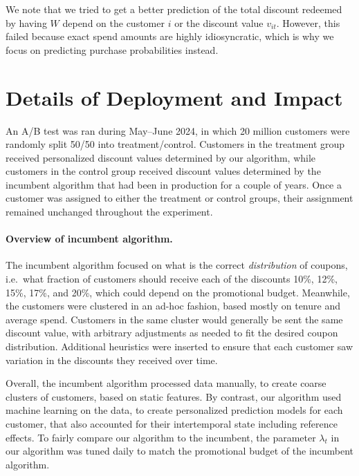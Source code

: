 \documentclass[format=acmsmall, review=false]{acmart}
\begin{document}
We note that we tried to get a better prediction of the total discount redeemed by having $W$ depend on the customer $i$ or the discount value $v_{it}$.  
However, this failed because exact spend amounts are highly idiosyncratic, which is why we focus on predicting purchase probabilities instead.

\section{Details of Deployment and Impact} \label{sec:deployResults}

An A/B test was ran during May--June 2024, in which 20 million customers were randomly split 50/50 into treatment/control.
Customers in the treatment group received personalized discount values determined by our algorithm, while
customers in the control group received discount values determined by the incumbent algorithm that had been in production for a couple of years.
Once a customer was assigned to either the treatment or control groups, their assignment remained unchanged throughout the experiment.

\paragraph{Overview of incumbent algorithm.}
The incumbent algorithm focused on what is the correct \textit{distribution} of coupons, i.e.\ what fraction of customers should receive each of the discounts 10\%, 12\%, 15\%, 17\%, and 20\%, which could depend on the promotional budget.
Meanwhile, the customers were clustered in an ad-hoc fashion, based mostly on tenure and average spend.
Customers in the same cluster would generally be sent the same discount value, with arbitrary adjustments as needed to fit the desired coupon distribution.
Additional heuristics were inserted to ensure that each customer saw variation in the discounts they received over time.

Overall, the incumbent algorithm processed data manually, to create coarse clusters of customers, based on static features.  By contrast, our algorithm used machine learning on the data, to create personalized prediction models for each customer, that also accounted for their intertemporal state including reference effects.  To fairly compare our algorithm to the incumbent, the parameter $\lambda_t$ in our algorithm was tuned daily to match the promotional budget of the incumbent algorithm.
\end{document}
